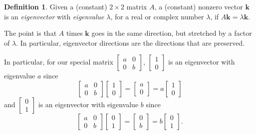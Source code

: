 \documentclass[12pt]{amsart}
\numberwithin{equation}{section}
\theoremstyle{plain} %
\theoremstyle{definition}
\newtheorem{defn}[equation]{Definition}
\theoremstyle{remark}
\begin{document}
\begin{defn} Given a (constant) $2\times 2$ matrix $A$, a (constant) nonzero vector $\mathbf{k}$ is an \emph{eigenvector} with \emph{eigenvalue} $\lambda$, for a real or complex number  $\lambda$, if $A\mathbf{k} = \lambda \mathbf{k}$. 
\end{defn}

The point is that $A$ times $\mathbf{k}$ goes in the same direction, but stretched by a factor of $\lambda$. In particular, eigenvector directions are the directions that are preserved.

In particular, for our special matrix $\begin{bmatrix} a & 0 \\ 0 & b\end{bmatrix}$,
$\begin{bmatrix} 1 \\ 0 \end{bmatrix}$ is an eigenvector with eigenvalue $a$ since
\[ \begin{bmatrix} a & 0 \\ 0 & b\end{bmatrix} \begin{bmatrix} 1 \\ 0 \end{bmatrix} =\begin{bmatrix} a \\ 0 \end{bmatrix} = a \begin{bmatrix} 1 \\ 0 \end{bmatrix}\]
and
$\begin{bmatrix} 0 \\ 1 \end{bmatrix}$ is an eigenvector with eigenvalue $b$ since
\[ \begin{bmatrix} a & 0 \\ 0 & b\end{bmatrix} \begin{bmatrix} 0 \\ 1 \end{bmatrix} =\begin{bmatrix} 0 \\ b \end{bmatrix} = b \begin{bmatrix} 0 \\ 1 \end{bmatrix}.\]
\end{document}
